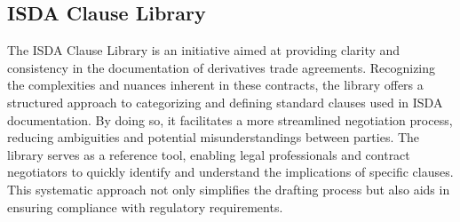 \subsection{ISDA Clause Library}
\label{subsec:clause_library}
The ISDA Clause Library \citep{isda_clause_library_factsheet} is an initiative aimed at providing clarity and consistency in the documentation of derivatives trade agreements. Recognizing the complexities and nuances inherent in these contracts, the library offers a structured approach to categorizing and defining standard clauses used in ISDA documentation. By doing so, it facilitates a more streamlined negotiation process, reducing ambiguities and potential misunderstandings between parties. The library serves as a reference tool, enabling legal professionals and contract negotiators to quickly identify and understand the implications of specific clauses. This systematic approach not only simplifies the drafting process but also aids in ensuring compliance with regulatory requirements.